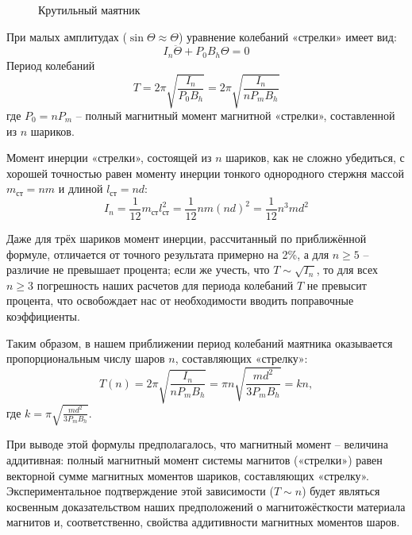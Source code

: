 \documentclass[14pt]{article}
\begin{document}
\begin{figure}[h!]
	\caption{Крутильный маятник}
	\label{fig:image}
\end{figure}

При малых амплитудах ($\sin\Theta \approx \Theta$) уравнение колебаний «стрелки» имеет вид:
$$
	I_n\ddot{\Theta} + P_0B_h\Theta = 0
$$
Период колебаний
$$
	T = 2\pi\sqrt{\frac{I_n}{P_0B_h}} = 2\pi\sqrt{\frac{I_n}{nP_mB_h}}
$$
где $P_0 = nP_m$ -- полный магнитный момент магнитной «стрелки», составленной из $n$ шариков.

Момент инерции «стрелки», состоящей из $n$ шариков, как не сложно убедиться, с хорошей точностью равен моменту инерции тонкого однородного стержня массой $m_\text{ст} = nm$ и длиной $l_\text{ст} = nd$:
$$
	I_n = \frac{1}{12}m_\text{ст}l^2_\text{ст} = \frac{1}{12}nm(nd)^2 = \frac{1}{12}n^3md^2
$$

Даже для трёх шариков момент инерции, рассчитанный по приближённой формуле, отличается от точного результата примерно на 2\%, а для $n\geq 5$ -- различие не превышает процента; если же учесть, что $T \sim \sqrt{I_n}$, то для всех $n \geq 3$ погрешность наших расчетов для периода колебаний $T$ не превысит процента, что освобождает нас от необходимости вводить поправочные коэффициенты.

Таким образом, в нашем приближении период колебаний маятника оказывается пропорциональным числу шаров $n$, составляющих «стрелку»:
$$
	T(n) = 2\pi\sqrt{\frac{I_n}{nP_mB_h}} = \pi n\sqrt{\frac{md^2}{3P_mB_h}} = kn,
$$
где $k = \pi\sqrt{\frac{md^2}{3P_mB_h}}$.

При выводе этой формулы предполагалось, что магнитный момент -- величина аддитивная: полный магнитный момент системы магнитов («стрелки») равен векторной сумме магнитных моментов шариков, составляющих «стрелку». Экспериментальное подтверждение этой зависимости ($T \sim n$) будет являться косвенным доказательством наших предположений о магнитожёсткости материала магнитов и, соответственно, свойства аддитивности магнитных моментов шаров.
\end{document}
